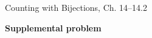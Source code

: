 \documentclass[handout]{mcs}
\begin{document}

\begin{staffnotes}
Counting with Bijections, Ch. 14--14.2
\end{staffnotes}



\newpage

\begin{center}
\textbf{\large Supplemental problem}
\end{center}



\end{document}
